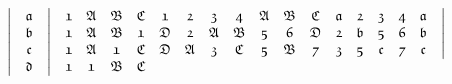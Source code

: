 \documentclass[final,12pt,a4paper,twoside,fleqn]{extbook}
\theoremstyle{definition}
\theoremstyle{remark}
\begin{document}
\begin{equation}
\begin{array}{@{}*{22}c@{}}
      {}             &%
      \big\vert        &%
      {\mathfrak{a}} &%
      \big\vert        &%
      {\mathfrak{1}} &%
      {\mathfrak{A}} &%
      {\mathfrak{B}} &%
      {\mathfrak{C}} &%
      {\mathfrak{1}} &%
      {\mathfrak{2}}       &%
      {\mathfrak{3}}        &%
      {\mathfrak{4}} &%
      {\mathfrak{A}}       &%
      {\mathfrak{B}}     &%
      {\mathfrak{C}}        &%
      {\mathfrak{a}} &%
      {\mathfrak{2}} &%
      {\mathfrak{3}} &%
      {\mathfrak{4}} &%
      {\mathfrak{a}} &%
      \big\vert         %
      \\ \nonumber
      {}             &%
      \big\vert        &%
      {\mathfrak{b}} &%
      \big\vert        &%
      {\mathfrak{1}} &%
      {\mathfrak{A}} &%
      {\mathfrak{B}} &%
      {\mathfrak{1}} &%
      {\mathfrak{D}} &%
      {\mathfrak{2}}       &%
      {\mathfrak{A}}        &%
      {\mathfrak{B}} &%
      {\mathfrak{5}}       &%
      {\mathfrak{6}}     &%
      {\mathfrak{D}}        &%
      {\mathfrak{2}} &%
      {\mathfrak{b}} &%
      {\mathfrak{5}} &%
      {\mathfrak{6}} &%
      {\mathfrak{b}} &%
      \big\vert         %
      \\ \nonumber
      {}             &%
      \big\vert        &%
      {\mathfrak{c}} &%
      \big\vert        &%
      {\mathfrak{1}} &%
      {\mathfrak{A}} &%
      {\mathfrak{1}} &%
      {\mathfrak{C}} &%
      {\mathfrak{D}} &%
      {\mathfrak{A}}       &%
      {\mathfrak{3}}        &%
      {\mathfrak{C}} &%
      {\mathfrak{5}}       &%
      {\mathfrak{B}}     &%
      {\mathfrak{7}}        &%
      {\mathfrak{3}} &%
      {\mathfrak{5}} &%
      {\mathfrak{c}} &%
      {\mathfrak{7}} &%
      {\mathfrak{c}} &%
      \big\vert         %
      \\ \nonumber
      {}             &%
      \big\vert        &%
      {\mathfrak{d}} &%
      \big\vert        &%
      {\mathfrak{1}} &%
      {\mathfrak{1}} &%
      {\mathfrak{B}} &%
      {\mathfrak{C}} &%

\end{array}
\end{equation}
\end{document}
